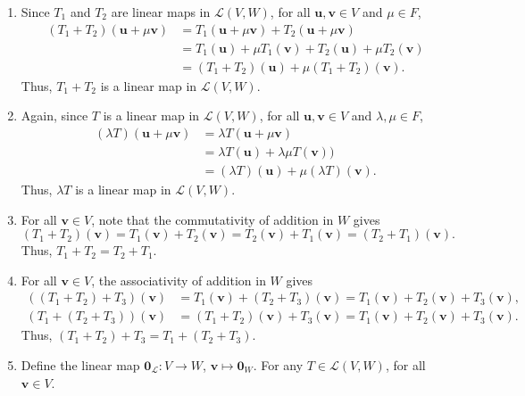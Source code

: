 \documentclass[10pt]{article}
\def\u{\bm{u}}
\def\v{\bm{v}}
\def\L{\mathcal{L}}
\begin{document}
        \begin{enumerate}
                \item 
                Since $T_1$ and $T_2$ are linear maps in $\L(V, W)$, for all $\u, \v \in V$ and $\mu \in F$,
                \begin{align*}
                        (T_1 + T_2)(\u + \mu\v) &= T_1(\u + \mu\v) + T_2(\u + \mu\v) \\
                                &= T_1(\u) + \mu T_1(\v) + T_2(\u) + \mu T_2(\v) \\
                                &= (T_1 + T_2)(\u) + \mu (T_1 + T_2)(\v).
                \end{align*}
                Thus, $T_1 + T_2$ is a linear map in $\L(V, W)$.
                \item 
                Again, since $T$ is a linear map in $\L(V, W)$, for all $\u, \v \in V$ and $\lambda, \mu \in F$,
                \begin{align*}
                        (\lambda T)(\u + \mu \v) &= \lambda T(\u + \mu \v) \\
                                &= \lambda T(\u) + \lambda\mu T(\v)) \\
                                &= (\lambda T)(\u) + \mu (\lambda T)(\v).
                \end{align*}
                Thus, $\lambda T$ is a linear map in $\L(V, W)$.
                \item 
                For all $\v\in V$, note that the commutativity of addition in $W$ gives
                \[
                        (T_1 + T_2)(\v) = T_1(\v) + T_2(\v) = T_2(\v) + T_1(\v) = (T_2 + T_1)(\v).
                \]
                Thus, $T_1 + T_2 = T_2 + T_1$.
                \item 
                For all $\v \in V$, the associativity of addition in $W$ gives
                \begin{align*}
                        ((T_1 + T_2) + T_3)(\v) &= T_1(\v) + (T_2 + T_3)(\v) = T_1(\v) + T_2(\v) + T_3(\v), \\
                        (T_1 + (T_2 + T_3))(\v) &= (T_1 + T_2)(\v) + T_3(\v) = T_1(\v) + T_2(\v) + T_3(\v).
                \end{align*}
                Thus, $(T_1 + T_2) + T_3 = T_1 + (T_2 + T_3)$.
                \item 
                Define the linear map $\mathbf{0}_\L\colon V \to W$, $\v \mapsto \mathbf{0}_W$. For any $T \in \L(V, W)$, for all $\v \in V$.
                \[
\]
\end{enumerate}
\end{document}
